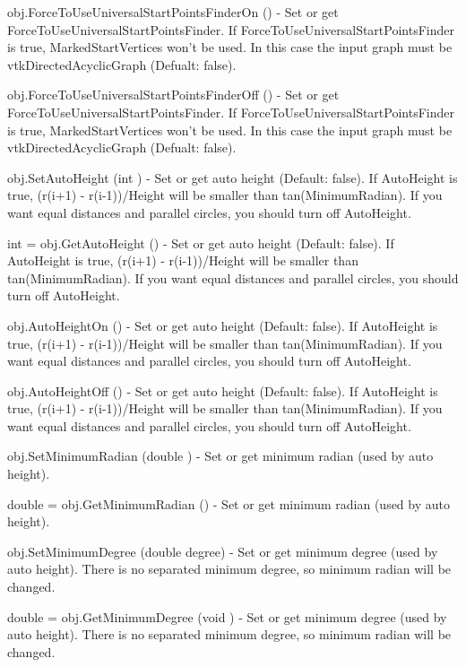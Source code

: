 \begin{DoxyItemize}
\item {\ttfamily obj.\-Force\-To\-Use\-Universal\-Start\-Points\-Finder\-On ()} -\/ Set or get Force\-To\-Use\-Universal\-Start\-Points\-Finder. If Force\-To\-Use\-Universal\-Start\-Points\-Finder is true, Marked\-Start\-Vertices won't be used. In this case the input graph must be vtk\-Directed\-Acyclic\-Graph (Defualt\-: false).  
\item {\ttfamily obj.\-Force\-To\-Use\-Universal\-Start\-Points\-Finder\-Off ()} -\/ Set or get Force\-To\-Use\-Universal\-Start\-Points\-Finder. If Force\-To\-Use\-Universal\-Start\-Points\-Finder is true, Marked\-Start\-Vertices won't be used. In this case the input graph must be vtk\-Directed\-Acyclic\-Graph (Defualt\-: false).  
\item {\ttfamily obj.\-Set\-Auto\-Height (int )} -\/ Set or get auto height (Default\-: false). If Auto\-Height is true, (r(i+1) -\/ r(i-\/1))/\-Height will be smaller than tan(\-Minimum\-Radian). If you want equal distances and parallel circles, you should turn off Auto\-Height.  
\item {\ttfamily int = obj.\-Get\-Auto\-Height ()} -\/ Set or get auto height (Default\-: false). If Auto\-Height is true, (r(i+1) -\/ r(i-\/1))/\-Height will be smaller than tan(\-Minimum\-Radian). If you want equal distances and parallel circles, you should turn off Auto\-Height.  
\item {\ttfamily obj.\-Auto\-Height\-On ()} -\/ Set or get auto height (Default\-: false). If Auto\-Height is true, (r(i+1) -\/ r(i-\/1))/\-Height will be smaller than tan(\-Minimum\-Radian). If you want equal distances and parallel circles, you should turn off Auto\-Height.  
\item {\ttfamily obj.\-Auto\-Height\-Off ()} -\/ Set or get auto height (Default\-: false). If Auto\-Height is true, (r(i+1) -\/ r(i-\/1))/\-Height will be smaller than tan(\-Minimum\-Radian). If you want equal distances and parallel circles, you should turn off Auto\-Height.  
\item {\ttfamily obj.\-Set\-Minimum\-Radian (double )} -\/ Set or get minimum radian (used by auto height).  
\item {\ttfamily double = obj.\-Get\-Minimum\-Radian ()} -\/ Set or get minimum radian (used by auto height).  
\item {\ttfamily obj.\-Set\-Minimum\-Degree (double degree)} -\/ Set or get minimum degree (used by auto height). There is no separated minimum degree, so minimum radian will be changed.  
\item {\ttfamily double = obj.\-Get\-Minimum\-Degree (void )} -\/ Set or get minimum degree (used by auto height). There is no separated minimum degree, so minimum radian will be changed.  

\end{DoxyItemize}
